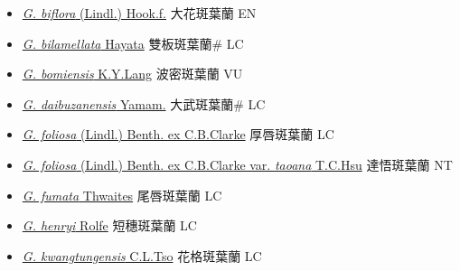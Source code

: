 \begin{itemize}
  \begin{itemize}
        \item[] \href{http://www.theplantlist.org/tpl1.1/search?q=Goodyera+biflora}{\textit{G. biflora} (Lindl.) Hook.f.}   大花斑葉蘭 EN
        \item[] \href{http://www.theplantlist.org/tpl1.1/search?q=Goodyera+bilamellata}{\textit{G. bilamellata} Hayata}   雙板斑葉蘭\# LC
        \item[] \href{http://www.theplantlist.org/tpl1.1/search?q=Goodyera+bomiensis}{\textit{G. bomiensis} K.Y.Lang}   波密斑葉蘭 VU
        \item[] \href{http://www.theplantlist.org/tpl1.1/search?q=Goodyera+daibuzanensis}{\textit{G. daibuzanensis} Yamam.}   大武斑葉蘭\# LC
        \item[] \href{http://www.theplantlist.org/tpl1.1/search?q=Goodyera+foliosa}{\textit{G. foliosa} (Lindl.) Benth. ex C.B.Clarke}   厚唇斑葉蘭 LC
        \item[] \href{http://www.theplantlist.org/tpl1.1/search?q=Goodyera+foliosa+var.+taoana}{\textit{G. foliosa} (Lindl.) Benth. ex C.B.Clarke var. \textit{taoana} T.C.Hsu}   達悟斑葉蘭 NT
        \item[] \href{http://www.theplantlist.org/tpl1.1/search?q=Goodyera+fumata}{\textit{G. fumata} Thwaites}   尾唇斑葉蘭 LC
        \item[] \href{http://www.theplantlist.org/tpl1.1/search?q=Goodyera+henryi}{\textit{G. henryi} Rolfe}     短穗斑葉蘭 LC
        \item[] \href{http://www.theplantlist.org/tpl1.1/search?q=Goodyera+kwangtungensis}{\textit{G. kwangtungensis} C.L.Tso}   花格斑葉蘭 LC

\end{itemize}
\end{itemize}
